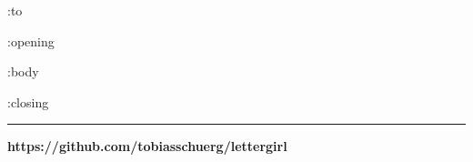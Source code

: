 \documentclass[version=last, Briefvorlage]{scrlttr2}
\begin{document}
	\begin{letter}
		{ :to }
		\opening{ :opening }
		:body
		\closing{ :closing }
		\indent
		\rule{3in}{0.4pt}

		\newpage
		\thispagestyle{empty} %
		\null
		\vfill
		\begin{center}
			\textbf{https://github.com/tobiasschuerg/lettergirl}
		\end{center}
		\vfill
	\end{letter}
\end{document}
